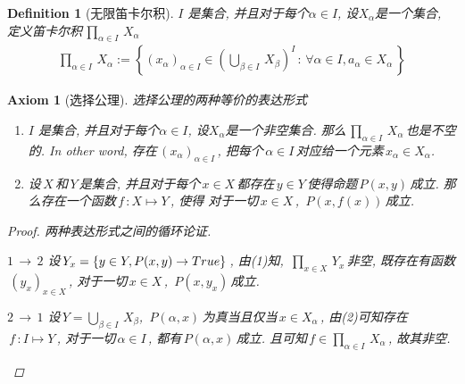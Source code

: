 \newtheorem{infinityDescartesProduct}[theorem_root]{Definition}
\begin{infinityDescartesProduct}[无限笛卡尔积]
\(I\) 是集合, 并且对于每个\(\alpha\in I\), 设\(X_\alpha\)是一个集合, 定义笛卡尔积\(\,\prod\limits_{\alpha\in I}\,X_\alpha\,\)
\begin{align*}
    \prod\limits_{\alpha\in I}\,X_\alpha := \left\{(x_\alpha)_{\alpha\in I}\in\left(\bigcup\limits_{\beta\in I}\,X_\beta\right)^I\,:\,\forall\alpha\in I, a_\alpha\in X_\alpha\,\right\}
\end{align*}
\end{infinityDescartesProduct}

\newtheorem{axiomOfChoice}[theorem_root]{Axiom}
\begin{axiomOfChoice}[选择公理]
选择公理的两种等价的表达形式
\begin{enumerate}
\item \(I\) 是集合, 并且对于每个\(\alpha\in I\), 设\(X_\alpha\)是一个非空集合. 那么\(\,\prod\limits_{\alpha\in I}\,X_\alpha\,\)也是不空的. In other word, 
存在\(\,(x_\alpha)_{\alpha\in I}\,\), 把每个\(\,\alpha\in I\,\)对应给一个元素\(\,x_\alpha\in X_\alpha\).
\item 设\(\,X\,\)和\(\,Y\,\)是集合, 并且对于每个\(\,x\in X\,\)都存在\(\,y\in Y\,\)使得命题\(\,P(x,y)\,\)成立. 那么存在一个函数\(\,f\,:X\mapsto Y\,\), 使得
对于一切\(\,x\in X\,\), \(\,P(x, f(x))\,\)成立.
\end{enumerate}

\begin{proof}
两种表达形式之间的循环论证.
\begin{description}
\item{\(1\,\rightarrow\,2\)\quad}
设\(\,Y_x=\{y\in Y, P(x,y)\to {True}\}\,\), 由(1)知, \(\,\prod\limits_{x\in X}\,Y_x\,\)非空, 既存在有函数\(\,(y_x)_{x\in X}\,\), 对于一切\(\,x\in X\,\), \(\,P(x,y_x)\,\)成立.
\item{\(2\,\rightarrow\,1\)\quad}
设\(\,Y=\bigcup\limits_{\beta\in I}\,X_\beta\), \(\,P(\alpha,x)\,\)为真当且仅当\(\,x\in X_\alpha\,\), 由(2)可知存在\(\,f\,:I\mapsto Y\,\), 对于一切\(\,\alpha\in I\,\), 都有\(\,P(\alpha, x)\,\)成立.
且可知\(\,f\in \prod\limits_{\alpha\in I}\,X_\alpha\,\), 故其非空.
\end{description}
\end{proof}
\end{axiomOfChoice}